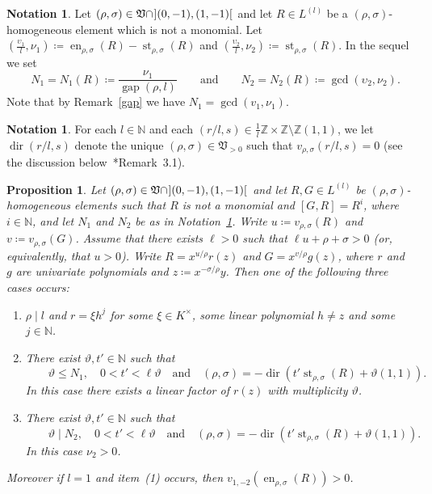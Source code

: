 \documentclass[reqno,a4paper]{amsart}
\newtheorem{proposition}[theorem]{Proposition}
\theoremstyle{definition}
\newtheorem{notation}[theorem]{Notation}
\theoremstyle{remark}
\DeclareMathOperator{\en}{en}
\DeclareMathOperator{\st}{st}
\DeclareMathOperator{\dir}{dir}
\DeclareMathOperator{\gap}{gap}
\begin{document}
\begin{notation}\label{starting y end}
Let $(\rho,\sigma)\in\mathfrak{V}\cap \hspace{0.7pt}](0,-1),(1,-1)[\hspace{0.7pt}$ and let $R\in L^{(l)}$ be a $(\rho,\sigma)$-ho\-mo\-ge\-neous element which is not a monomial. Let $\left(\frac{\upsilon_1}{l},\nu_1\right)\coloneqq  \en_{\rho,\sigma}(R) -\st_{\rho,\sigma}(R)$ and $\left(\frac{\upsilon_2}{l},\nu_2\right)\coloneqq \st_{\rho,\sigma}(R)$. In the sequel we set
$$
\quad N_1=N_1(R)\coloneqq \frac{\nu_1}{\gap(\rho,l)}\qquad\text{and}\qquad N_2=N_2(R)\coloneqq \gcd(\upsilon_2,\nu_2).
$$
Note that by Remark~\ref{gap} we have $N_1=\gcd(v_1,\nu_1)$.
\end{notation}

\begin{notation} For each $l\in \mathds{N}$ and each $(r/l,s)\in\frac{1}{l}\mathds{Z}\times\mathds{Z}\setminus\mathds{Z}(1,1)$, we let $\dir(r/l,s)$ denote the unique $(\rho,\sigma)\in\mathfrak{V}_{>0}$ such that $v_{\rho,\sigma}(r/l,s)=0$ (see the discussion below~\cite{GGV}*{Remark~3.1}).
\end{notation}

\begin{proposition}\label{finitas direcciones} Let $(\rho,\sigma)\in\mathfrak{V}\cap \hspace{0.7pt}](0,-1),(1,-1)[\hspace{0.7pt}$ and let $R,G\in L^{(l)}$ be $(\rho,\sigma)$-ho\-mo\-ge\-neous elements such that $R$ is not a monomial and $[G,R]= R^i$, where $i\in \mathds{N}$, and let $N_1$ and $N_2$ be as in Notation~\ref{starting y end}. Write $u\coloneqq v_{\rho,\sigma}(R)$ and $v\coloneqq v_{\rho,\sigma}(G)$. Assume that there exists $\ell>0$ such that $\ell u +\rho+\sigma>0$ (or, equivalently, that $u>0$). Write $R= x^{u/\rho}r(z)$ and $G=x^{v/\rho}g(z)$, where $r$ and $g$ are univariate polynomials and $z\coloneqq x^{-\sigma/\rho}y$. Then one of the following three cases occurs:
\begin{enumerate}

\smallskip

\item $\rho\mid l$ and $r=\xi h^j$ for some $\xi\in K^{\times}$, some linear polynomial $h\ne z$ and some $j\in \mathds{N}$.

\smallskip

\item There exist $\vartheta,t'\in \mathds{N}$ such that
$$
\qquad \vartheta\le N_1,\quad 0<t'<\ell \vartheta \quad\text{and}\quad (\rho,\sigma)=-\dir\left(t'\st_{\rho,\sigma}(R)+ \vartheta (1,1)\right).
$$
In this case there exists a linear factor of $r(z)$ with multiplicity $\vartheta$.

\smallskip

\item There exist $\vartheta,t'\in \mathds{N}$ such that
$$
\qquad \vartheta\mid N_2,\quad 0<t'<\ell \vartheta \quad\text{and}\quad (\rho,\sigma)= -\dir\left(t'\st_{\rho,\sigma}(R)+\vartheta (1,1)\right).
$$
In this case $\nu_2>0$.
\end{enumerate}
Moreover if $l=1$ and item~(1) occurs, then $v_{1,-2}(\en_{\rho,\sigma}(R))>0$.
\end{proposition}
\end{document}
